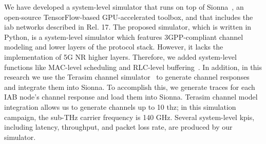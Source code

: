 We have developed a system-level simulator that runs on top of Sionna~\cite{hoydis2022sionna}, an open-source TensorFlow-based GPU-accelerated toolbox, and that includes 
the \gls{iab} networks described in Rel. 17. 
The proposed simulator, which is written in Python, is a system-level simulator which features 3GPP-compliant channel modeling and lower layers of the protocol stack. 
%
However, it
lacks the implementation of 5G NR higher layers. 
Therefore, we added system-level functions like MAC-level scheduling and RLC-level buffering~\cite{INFOCOMSIM}. In addition, in this research we use the Terasim channel simulator~\cite{hossain2018terasim}
to generate channel responses and integrate them into Sionna. To accomplish this, we generate traces for each IAB node's channel response and load them into Sionna. Terasim channel model integration allows us to generate channels up to 10 \gls{thz};
in this simulation campaign, the sub-THz carrier frequency is 140 GHz. Several system-level \glspl{kpi}, including latency, throughput, and packet loss rate, are produced by our simulator.


